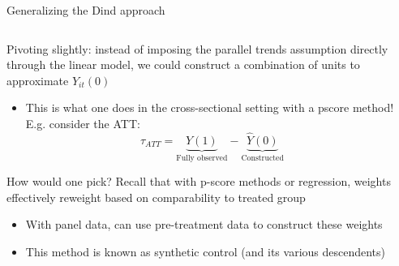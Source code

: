 \documentclass[notes,11pt, aspectratio=169]{beamer}
\newenvironment{wideitemize}{\itemize\addtolength{\itemsep}{10pt}}{\enditemize}
\begin{document}
\begin{frame}{Generalizing the Dind approach }
  \begin{columns}[T] %
    \begin{column}{0.9\textwidth}
      \begin{wideitemize}
      \item Pivoting slightly: instead of imposing the parallel trends
        assumption directly through the linear model, we could
        construct a combination of units to approximate $Y_{it}(0)$
        \begin{itemize}
        \item This is what one does in the cross-sectional setting with a
          pscore method! E.g. consider the ATT:
          \begin{equation*}
            \tau_{ATT} = \underbrace{Y(1)}_{\text{Fully observed}} - \underbrace{\hat{Y}(0)}_{\text{Constructed}}
          \end{equation*}
        \end{itemize}
      \item How would one pick? Recall that with p-score methods or
        regression, weights effectively reweight based on
        comparability to treated group
        \begin{itemize}
        \item With panel data, can use pre-treatment data to construct
          these weights
        \item This method is known as synthetic control (and its various descendents)
        \end{itemize}
      \end{wideitemize}
    \end{column}%
    \hfill%
    \begin{column}{.5\textwidth}
    \end{column}%
  \end{columns}
\end{frame}
\end{document}
